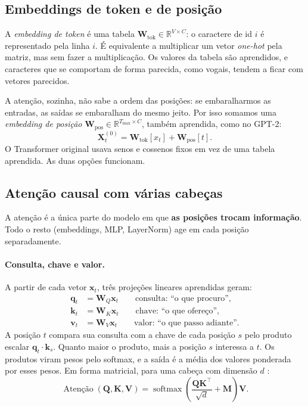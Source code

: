 \documentclass[11pt,a4paper]{article}
\newcommand{\R}{\mathbb{R}}
\newcommand{\softmax}{\operatorname{softmax}}
\begin{document}
\subsection{Embeddings de token e de posição}

A \emph{embedding de token} é uma tabela $\bm W_{\text{tok}} \in \R^{V\times C}$: o caractere de id $i$ é representado pela linha $i$. É equivalente a multiplicar um vetor \emph{one-hot} pela matriz, mas sem fazer a multiplicação. Os valores da tabela são aprendidos, e caracteres que se comportam de forma parecida, como vogais, tendem a ficar com vetores parecidos.

A atenção, sozinha, não sabe a ordem das posições: se embaralharmos as entradas, as saídas se embaralham do mesmo jeito. Por isso somamos uma \emph{embedding de posição} $\bm W_{\text{pos}} \in \R^{T_{\max}\times C}$, também aprendida, como no GPT-2:
\begin{equation}
\bm X^{(0)}_t = \bm W_{\text{tok}}[x_t] + \bm W_{\text{pos}}[t].
\end{equation}
O Transformer original \cite{vaswani} usava senos e cossenos fixos em vez de uma tabela aprendida. As duas opções funcionam.

\subsection{Atenção causal com várias cabeças}

A atenção é a única parte do modelo em que \textbf{as posições trocam informação}. Todo o resto (embeddings, MLP, LayerNorm) age em cada posição separadamente.

\paragraph{Consulta, chave e valor.} A partir de cada vetor $\bm x_t$, três projeções lineares aprendidas geram:
\begin{align*}
\bm q_t &= \bm W_Q \bm x_t \qquad \text{consulta: ``o que procuro''},\\
\bm k_t &= \bm W_K \bm x_t \qquad \text{chave: ``o que ofereço''},\\
\bm v_t &= \bm W_V \bm x_t \qquad \text{valor: ``o que passo adiante''}.
\end{align*}
A posição $t$ compara sua consulta com a chave de cada posição $s$ pelo produto escalar $\bm q_t \cdot \bm k_s$. Quanto maior o produto, mais a posição $s$ interessa a $t$. Os produtos viram pesos pelo softmax, e a saída é a média dos valores ponderada por esses pesos. Em forma matricial, para uma cabeça com dimensão $d$ \cite{vaswani}:
\begin{equation}
\operatorname{Atenção}(\bm Q, \bm K, \bm V) = \softmax\!\left(\frac{\bm Q \bm K^\top}{\sqrt{d}} + \bm M\right) \bm V .
\label{eq:atencao}
\end{equation}
\end{document}
